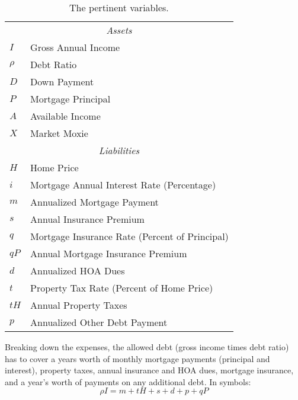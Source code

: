 \documentclass{article}
\begin{document}
\begin{table}
\begin{center}
\begin{tabular}{ll}
\hline
\hline
\multicolumn{2}{c}{\emph{Assets}} \\
$I$ & Gross Annual Income \\
$\rho$ & Debt Ratio \\
$D$ & Down Payment \\
$P$ & Mortgage Principal \\
$A$ & Available Income \\
$X$ & Market Moxie \\
\hline
\multicolumn{2}{c}{\emph{Liabilities}} \\
$H$ & Home Price \\
$i$ & Mortgage Annual Interest Rate (Percentage)\\
$m$ & Annualized Mortgage Payment \\
$s$ & Annual Insurance Premium \\
$q$ & Mortgage Insurance Rate (Percent of Principal)\\
$qP$ & Annual Mortgage Insurance Premium \\
$d$ & Annualized HOA Dues \\
$t$ & Property Tax Rate (Percent of Home Price) \\
$tH$ & Annual Property Taxes \\
$p$ & Annualized Other Debt Payment \\
\hline
\hline
\end{tabular}
\caption{The pertinent variables.}
\label{table:variables}
\end{center}
\end{table}

\pagebreak

Breaking down the expenses, the allowed
debt (gross income times debt ratio) has to cover 
a years worth of monthly mortgage payments (principal and interest), property taxes, 
annual insurance and HOA dues, mortgage insurance, and a year's worth of payments on 
any additional debt. In symbols:
\begin{equation}
\label{DebtRatio}
\rho I = m + tH + s + d + p + qP
\end{equation}
\end{document}

